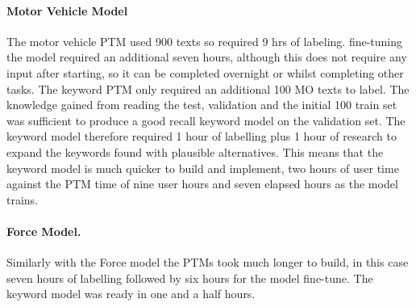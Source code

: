 \paragraph{Motor Vehicle Model} The motor vehicle PTM used 900 texts so required 9 hrs of labeling. fine-tuning the model required an additional seven hours, although this does not require any input after starting, so it can be completed overnight or whilst completing other tasks. The keyword PTM only required an additional 100 MO texts to label. The knowledge gained from reading the test, validation and the initial 100 train set was sufficient to produce a good recall keyword model on the validation set. The keyword model therefore required 1 hour of labelling plus 1 hour of research to expand the keywords found with plausible alternatives. This means that the keyword model is much quicker to build and implement, two hours of user time against the PTM time of nine user hours and seven elapsed hours as the model trains.  

\paragraph{Force Model.} Similarly with the Force model the PTMs took much longer to build, in this case seven hours of labelling followed by six hours for the model fine-tune. The keyword model was ready in one and a half hours.

